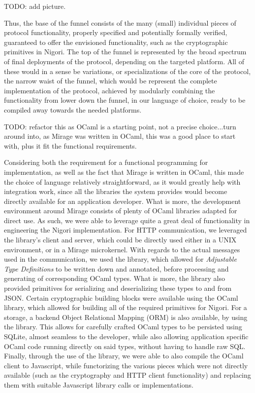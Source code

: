 TODO: add picture.

Thus, the base of the funnel consists of the many (small) individual pieces of protocol functionality, properly specified and potentially formally verified, guaranteed to offer the envisioned functionality, such as the cryptographic primitives in Nigori.
The top of the funnel is represented by the broad spectrum of final deployments of the protocol, depending on the targeted platform.
All of these would in a sense be variations, or specializations of the core of the protocol, the narrow waist of the funnel, which would be represent the complete implementation of the protocol, achieved by modularly combining the functionality from lower down the funnel, in our language of choice, ready to be compiled away towards the needed platforms.

TODO: refactor this as OCaml is a starting point, not a precise choice...turn around into, as Mirage was written in OCaml, this was a good place to start with, plus it fit the functional requirements.

Considering both the requirement for a functional programming for implementation, as well as the fact that Mirage is written in OCaml, this made the choice of language relatively straightforward, as it would greatly help with integration work, since all the libraries the system provides would become directly available for an application developer.
What is more, the development environment around Mirage consists of plenty of OCaml libraries adapted for direct use.
As such, we were able to leverage quite a great deal of functionality in engineering the Nigori implementation.
For HTTP communication, we leveraged the  library's client and server, which could be directly used either in a UNIX environment, or in a Mirage microkernel.
With regards to the actual messages used in the communication, we used the  library, which allowed for \textit{Adjustable Type Definitions} to be written down and annotated, before processing and generating of corresponding OCaml types.
What is more, the library also provided primitives for serializing and deserializing these types to and from JSON.
Certain cryptographic building blocks were available using the OCaml  library, which allowed for building all of the required primitives for Nigori.
For a storage, a backend Object Relational Mapping (ORM) is also available, by using the  library.
This allows for carefully crafted OCaml types to be persisted using SQLite, almost seamless to the developer, while also allowing application specific OCaml code running directly on said types, without having to handle raw SQL.
Finally, through the use of the  library, we were able to also compile the OCaml client to Javascript, while functorizing the various pieces which were not directly available (such as the cryptography and HTTP client functionality) and replacing them with suitable Javascript library calls or implementations.
